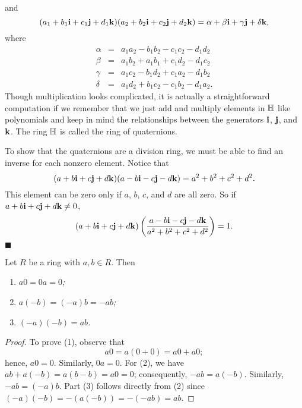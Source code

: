 and
\[
(a_1 + b_1 {\bold i}  + c_1 {\bold j} +d_1 {\bold k} ) ( a_2 + b_2
{\bold i}  + c_2 {\bold j} +d_2 {\bold k} ) = \alpha + \beta {\bold
i}  + \gamma {\bold j} + \delta {\bold k},
\]
where
\begin{eqnarray*}
\alpha & = & a_1 a_2 - b_1 b_2 - c_1 c_2 -d_1 d_2 \\
\beta & = & a_1 b_2 + a_1 b_1 + c_1 d_2 - d_1 c_2 \\
\gamma & = & a_1 c_2 - b_1 d_2 + c_1 a_2 - d_1 b_2 \\
\delta & = & a_1 d_2 + b_1 c_2 - c_1 b_2 - d_1 a_2.
\end{eqnarray*}
Though multiplication looks complicated, it is actually a
straightforward computation if we remember that we just add and
multiply elements in ${\Bbb H}$ like polynomials and keep in mind the
relationships between the generators ${\bold i}$, ${\bold j}$, and
${\bold k}$. The ring ${\Bbb H}$ is called the ring of {\bfi
quaternions}.
 
 
To show that the quaternions are a division ring, we must be able to
find an inverse for each nonzero element. Notice that 
\[
( a + b {\bold i}  + c {\bold j} +d {\bold k} )( a - b
{\bold i}  - c {\bold j}
-d {\bold k} ) = a^2 + b^2 + c^2 + d^2.
\]
This element can be zero only if $a$, $b$, $c$, and $d$ are
all zero. So if $a + b {\bold i}  + c {\bold j} +d {\bold k}
\neq 0$,
\[
( a + b {\bold i}  + c {\bold j} +d {\bold k} )
\left(
\frac{a - b {\bold i} - c {\bold j} - d {\bold k} }{ a^2 + b^2 + c^2
+ d^2 }
\right)
= 1.
\]
\hspace{\fill} $\blacksquare$
 
 
\begin{proposition}
Let $R$ be a ring with $a, b \in R$. Then
\begin{enumerate}
 
\rm \item \it
$a0 = 0a = 0$;
 
\rm \item \it
$a(-b) = (-a)b = -ab$;
 
\rm \item \it
$(-a)(-b) =ab$.
 
\end{enumerate}
\end{proposition}
 
 
\begin{proof}
To prove (1), observe that
\[
a0 = a(0+0)= a0+ a0;
\]
hence, $a0=0$. Similarly, $0a = 0$. For (2), we have $ab + a(-b) =
a(b-b) = a0 = 0$; consequently, $-ab = a(-b)$. Similarly, $-ab =
(-a)b$. Part (3) follows directly from (2) since $(-a)(-b) = -(a(- b))
= -(-ab) = ab$. 
\end{proof}
 
